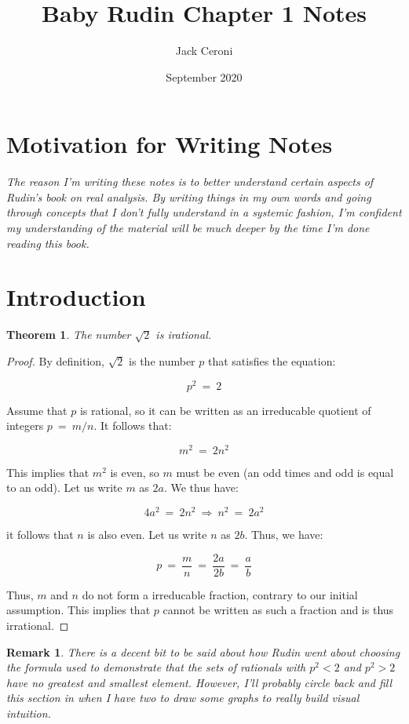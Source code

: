 \documentclass[10pt, oneside]{article}
\title{Baby Rudin Chapter 1 Notes}
\author{Jack Ceroni}
\date{September 2020}
\newtheorem{thm}{Theorem}
\newtheorem{rem}{Remark}
\begin{document}
\maketitle
\tableofcontents

\vspace{.25in}

\section{Motivation for Writing Notes}

\textit{The reason I'm writing these notes is to better understand certain aspects of Rudin's
	book on real analysis. By writing things in my own words and going through 
	concepts that I don't fully understand in a systemic fashion, I'm confident my 
	understanding of the material will be much deeper by the time I'm done reading this book.}

\section{Introduction}

\begin{thm}
The number $\sqrt{2}$ is irational.
\end{thm}

\begin{proof}
	By definition, $\sqrt{2}$ is the number $p$ that satisfies the 
	equation:

	$$p^2 \ = \ 2$$

	Assume that $p$ is rational, so it can be written as an irreducable 
	quotient of integers $p \ = \ m/n$. It follows that:

	$$m^2 \ = \ 2n^2$$

	This implies that $m^2$ is even, so $m$ must be even (an odd times and odd is equal
	to an odd). Let us write $m$ as $2a$. We thus have:

	$$4a^2 \ = \ 2n^2 \ \Rightarrow \ n^2 \ = \ 2a^2$$

	it follows that $n$ is also even. Let us write $n$ as $2b$. Thus, we have:

	$$p \ = \ \frac{m}{n} \ = \ \frac{2a}{2b} \ = \ \frac{a}{b}$$

	Thus, $m$ and $n$ do not form a irreducable fraction, contrary to our initial 
	assumption. This implies that $p$ cannot be written as such a fraction and is thus 
	irrational.
\end{proof}

\begin{rem}
  There is a decent bit to be said about how Rudin went about choosing the formula used to demonstrate that the sets of rationals with
  $p^2 < 2$ and $p^2 > 2$ have no greatest and smallest element. However, I'll probably circle back and fill this section in when
  I have two to draw some graphs to really build visual intuition.
\end{rem}
\end{document}
